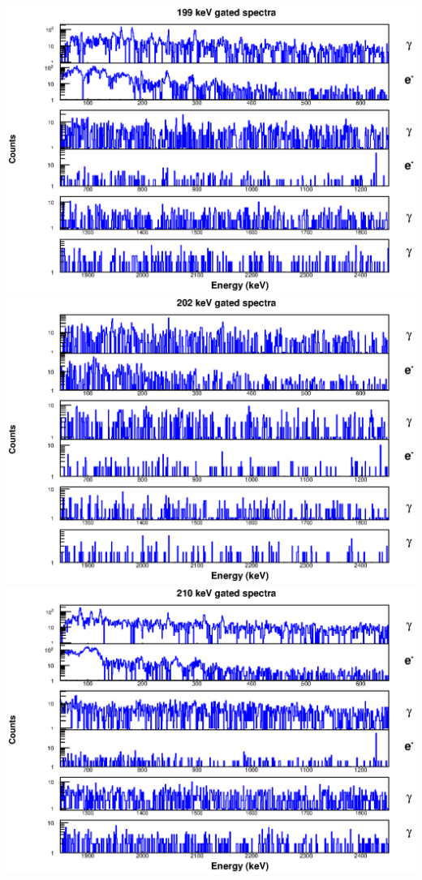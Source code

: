 \includegraphics[scale=0.8]{154Gd_Appendix/199_combined.eps}
\includegraphics[scale=0.8]{154Gd_Appendix/202_combined.eps}
\includegraphics[scale=0.8]{154Gd_Appendix/210_combined.eps}
